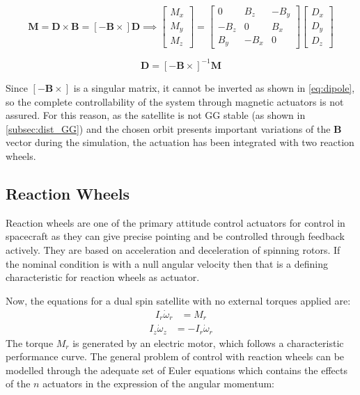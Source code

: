 \begin{equation}
    \boldsymbol{M} = \boldsymbol{D} \times \boldsymbol{B} =
	\left[ -\boldsymbol{B} \times \right] \boldsymbol{D}
	\implies
	\begin{bmatrix}
		M_x \\ M_y \\ M_z
	\end{bmatrix}
	=
	\begin{bmatrix}
		0 & B_z & -B_y \\
		-B_z & 0 & B_x \\
		B_y & -B_x & 0
	\end{bmatrix}
	\begin{bmatrix}
		D_x \\ D_y \\ D_z
	\end{bmatrix}
\end{equation}

\begin{equation} \label{eq:dipole}
	\boldsymbol{D} = \left[ -\boldsymbol{B} \times \right] ^{-1} \boldsymbol{M}
\end{equation}

Since $\left[ -\boldsymbol{B} \times \right]$ is a singular matrix, it cannot be inverted as shown in \autoref{eq:dipole}, so the complete controllability of the system through magnetic actuators is not assured.
For this reason, as the satellite is not GG stable (as shown in \autoref{subsec:dist_GG}) and the chosen orbit presents important variations of the $\boldsymbol{B}$ vector during the simulation, the actuation has been integrated with two reaction wheels.


\subsection{Reaction Wheels}
\label{subsec:reaction_wheels}

Reaction wheels are one of the primary attitude control actuators for control in spacecraft as they can give precise pointing and be controlled through feedback actively. They are based on acceleration and deceleration of spinning rotors. If the nominal condition is with a null angular velocity then that is a defining characteristic for reaction wheels as actuator.

Now, the equations for a dual spin satellite with no external torques applied are:
     \begin{align*}
		  I_{r}\dot{\omega}_{r} &= M_{r}
     \end{align*}
     \begin{align*}
	    I_{z}\dot{\omega}_{z} &= -I_{r}\dot{\omega}_{r}
     \end{align*}
The torque \( M_{r} \) is generated by an electric motor, which follows a characteristic performance curve. The general problem of control with reaction wheels can be modelled through the adequate set of Euler equations which contains the effects of the \( n \) actuators in the expression of the angular momentum:

